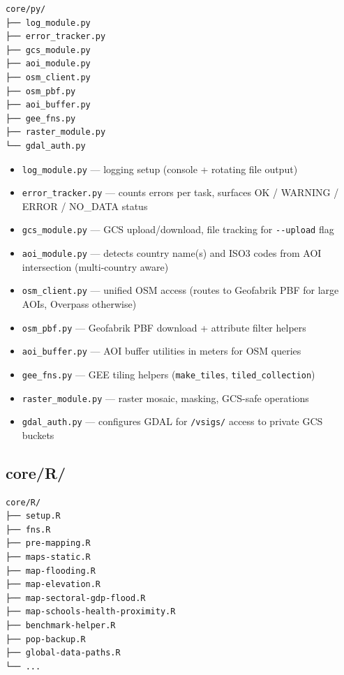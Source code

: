 \documentclass[
  letterpaper,
  DIV=11,
  numbers=noendperiod]{scrreprt}
\providecommand{\tightlist}{%
  \setlength{\itemsep}{0pt}\setlength{\parskip}{0pt}}
\begin{document}
\begin{verbatim}
core/py/
├── log_module.py
├── error_tracker.py
├── gcs_module.py
├── aoi_module.py
├── osm_client.py
├── osm_pbf.py
├── aoi_buffer.py
├── gee_fns.py
├── raster_module.py
└── gdal_auth.py
\end{verbatim}

\begin{itemize}
\tightlist
\item
  \texttt{log\_module.py} --- logging setup (console + rotating file
  output)
\item
  \texttt{error\_tracker.py} --- counts errors per task, surfaces OK /
  WARNING / ERROR / NO\_DATA status
\item
  \texttt{gcs\_module.py} --- GCS upload/download, file tracking for
  \texttt{-\/-upload} flag
\item
  \texttt{aoi\_module.py} --- detects country name(s) and ISO3 codes
  from AOI intersection (multi-country aware)
\item
  \texttt{osm\_client.py} --- unified OSM access (routes to Geofabrik
  PBF for large AOIs, Overpass otherwise)
\item
  \texttt{osm\_pbf.py} --- Geofabrik PBF download + attribute filter
  helpers
\item
  \texttt{aoi\_buffer.py} --- AOI buffer utilities in meters for OSM
  queries
\item
  \texttt{gee\_fns.py} --- GEE tiling helpers (\texttt{make\_tiles},
  \texttt{tiled\_collection})
\item
  \texttt{raster\_module.py} --- raster mosaic, masking, GCS-safe
  operations
\item
  \texttt{gdal\_auth.py} --- configures GDAL for \texttt{/vsigs/} access
  to private GCS buckets
\end{itemize}

\subsection{core/R/}\label{corer}

\begin{verbatim}
core/R/
├── setup.R
├── fns.R
├── pre-mapping.R
├── maps-static.R
├── map-flooding.R
├── map-elevation.R
├── map-sectoral-gdp-flood.R
├── map-schools-health-proximity.R
├── benchmark-helper.R
├── pop-backup.R
├── global-data-paths.R
└── ...
\end{verbatim}
\end{document}
